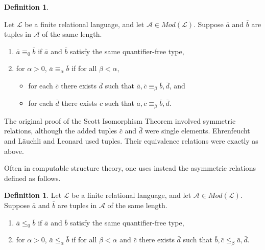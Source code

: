 \documentclass[10pt,a4paper]{article}
\theoremstyle{definition}
\newtheorem{defn}[thm]{Definition}
\begin{document}
	\begin{defn}\label{defn:bfsym}
		
		Let $\mathcal{L}$ be a finite relational language, and let $\mathcal{A}\in Mod(\mathcal{L})$. Suppose $\bar{a}$ and $\bar{b}$ are tuples in $\mathcal{A}$ of the same length. 
		
		\begin{enumerate}
			
			\item $\bar{a}\equiv_0\bar{b}$ if $\bar{a}$ and $\bar{b}$ satisfy the same quantifier-free type,
			
			\item for $\alpha > 0$, $\bar{a}\equiv_\alpha\bar{b}$ if for all $\beta <\alpha$,
			\begin{itemize}
				\item for each $\bar{c}$ there exists $\bar{d}$ such that $\bar{a},\bar{c}\equiv_\beta\bar{b},\bar{d}$, and
				\item for each $\bar{d}$ there exists $\bar{c}$ such that $\bar{a},\bar{c}\equiv_\beta\bar{b},\bar{d}$.
			\end{itemize}
			
		\end{enumerate}
		
	\end{defn}
	
	The original proof of the Scott Isomorphism Theorem \cite{Scott} involved symmetric relations, although the added tuples $\bar{c}$ and $\bar{d}$ were single elements. Ehrenfeucht \cite{Ehrenfeucht} and L\"{a}uchli and Leonard \cite{Lauchli} used tuples. Their equivalence relations were exactly as above. 
	
	Often in computable structure theory, one uses instead the asymmetric relations defined as follows.
	\begin{defn}
		
		Let $\mathcal{L}$ be a finite relational language, and let $\mathcal{A}\in Mod(\mathcal{L})$. Suppose $\bar{a}$ and $\bar{b}$ are tuples in $\mathcal{A}$ of the same length. 
		
		\begin{enumerate}
			
			\item $\bar{a}\leq_0\bar{b}$ if $\bar{a}$ and $\bar{b}$ satisfy the same quantifier-free type,
			
			\item for $\alpha > 0$, $\bar{a}\leq_\alpha\bar{b}$ if for all $\beta <\alpha$ and $\bar{c}$ there exists $\bar{d}$ such that $\bar{b},\bar{c}\leq_\beta\bar{a},\bar{d}$.
			
		\end{enumerate}
		
	\end{defn}
	
\end{document}
